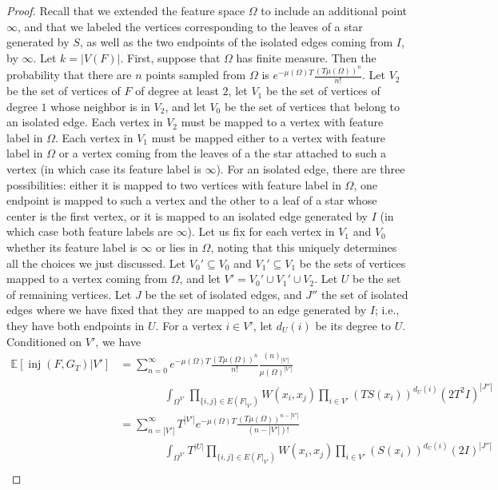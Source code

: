 \documentclass{amsart}
\numberwithin{equation}{section}
\numberwithin{figure}{section}
\theoremstyle{definition}
\theoremstyle{remark}
\DeclareMathOperator{\inj}{inj}
\newcommand{\EE}{\mathbb{E}}
\begin{document}
\begin{proof}
Recall that we extended the feature space $\Omega$ to include an additional
point $\infty$, and that we labeled the vertices corresponding to the leaves
of a star generated by $S$, as well as the two endpoints of the isolated
edges coming from $I$, by $\infty$. Let $k=|V(F)|$. First, suppose that
$\Omega$ has finite measure. Then the probability that there are $n$ points
sampled from $\Omega$ is $e^{-\mu(\Omega)T}\frac{(T\mu(\Omega))^n}{n!}$. Let
$V_2$ be the set of vertices of $F$ of degree at least $2$, let $V_1$ be the
set of vertices of degree $1$ whose neighbor is in $V_2$, and let $V_0$ be
the set of vertices that belong to an isolated edge. Each vertex in $V_2$
must be mapped to a vertex with feature label in $\Omega$. Each vertex in
$V_1$ must be mapped either to a vertex with feature label in $\Omega$ or a
vertex coming from the leaves of a the star attached to such a vertex (in
which case its feature label is $\infty$). For an isolated edge, there are
three possibilities: either it is mapped to two vertices with feature label
in $\Omega$, one endpoint is mapped to such a vertex and the other to a leaf
of a star whose center is the first vertex, or it is mapped to an isolated
edge generated by $I$ (in which case both feature labels are $\infty$). Let
us fix for each vertex in $V_1$ and $V_0$ whether its feature label is
$\infty$ or lies in $\Omega$, noting that this uniquely determines all the
choices we just discussed. Let $V_0' \subseteq V_0$ and $V_1' \subseteq V_1$
be the sets of vertices mapped to a vertex coming from $\Omega$, and let
$V'=V_0'\cup V_1' \cup V_2$. Let $U$ be the set of remaining vertices. Let
$J$ be the set of isolated edges, and $J''$ the set of isolated edges where
we have fixed that they are mapped to an edge generated by $I$; i.e., they
have both endpoints in $U$. For a vertex $i \in V'$, let $d_U(i)$ be its
degree to $U$. Conditioned on $V'$, we have
\begin{align*}
\EE[\inj(F,G_T)|V']
&=
\sum_{n=0}^\infty e^{-\mu(\Omega)T}\frac{(T\mu(\Omega))^n}{n!} \frac{(n)_{|V'|}}{\mu(\Omega)^{|V'|}} \\
& \qquad \qquad \int_{\Omega^{V'}}\prod_{\{i,j\} \in E(F|_{V'})} W(x_i,x_j) \prod_{i \in V'} (TS(x_i))^{d_U(i)} (2T^2I)^{|J''|}\\
&=
\sum_{n=|V'|}^\infty T^{|V'|} e^{-\mu(\Omega)T}\frac{(T\mu(\Omega))^{n-|V'|}}{(n-|V'|)!} \\
& \qquad \qquad \int_{\Omega^{V'}}T^{|U|}\prod_{\{i,j\} \in E(F|_{V'})} W(x_i,x_j) \prod_{i \in V'} (S(x_i))^{d_U(i)} (2I)^{|J''|}\\

\end{align*}
\end{proof}
\end{document}

